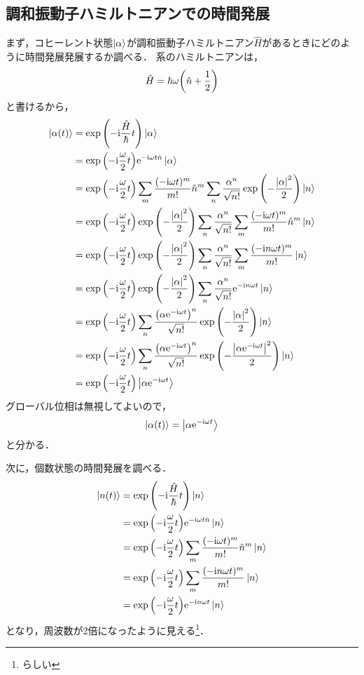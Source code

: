 \documentclass{report}
\begin{document}
  \subsection{調和振動子ハミルトニアンでの時間発展}
    まず，コヒーレント状態$\ket{\alpha}$が調和振動子ハミルトニアン$\hat{H}$があるときにどのように時間発展発展するか調べる．
    系のハミルトニアンは，
    \begin{align}
      \hat{H} = \hbar\omega\qty(\hat{n} + \frac{1}{2})
    \end{align}
    と書けるから，
    \begin{align}
      \ket{\alpha(t)} &= \exp\qty(-\mathrm{i}\frac{\hat{H}}{\hbar}t)\ket{\alpha} \\ 
      &= \exp\qty(-\mathrm{i}\frac{\omega}{2}t)\mathrm{e}^{-\mathrm{i}\omega t \hat{n}}\ket{\alpha} \\ 
      &= \exp\qty(-\mathrm{i}\frac{\omega}{2}t)\sum_{m}\frac{(-\mathrm{i}\omega t)^m}{m!}\hat{n}^m \sum_{n}\frac{\alpha^n}{\sqrt{n!}}\exp\qty(-\frac{\abs{\alpha}^2}{2})\ket{n} \\ 
      &= \exp\qty(-\mathrm{i}\frac{\omega}{2}t)\exp\qty(-\frac{\abs{\alpha}^2}{2}) \sum_{n}\frac{\alpha^n}{\sqrt{n!}}\sum_{m}\frac{(-\mathrm{i}\omega t)^m}{m!}\hat{n}^m\ket{n} \\ 
      &= \exp\qty(-\mathrm{i}\frac{\omega}{2}t)\exp\qty(-\frac{\abs{\alpha}^2}{2}) \sum_{n}\frac{\alpha^n}{\sqrt{n!}}\sum_{m}\frac{(-\mathrm{i} n\omega t)^m}{m!} \ket{n} \\ 
      &= \exp\qty(-\mathrm{i}\frac{\omega}{2}t)\exp\qty(-\frac{\abs{\alpha}^2}{2}) \sum_{n}\frac{\alpha^n}{\sqrt{n!}}\mathrm{e}^{-\mathrm{i} n\omega t}\ket{n} \\ 
      &= \exp\qty(-\mathrm{i}\frac{\omega}{2}t) \sum_{n}\frac{\qty(\alpha\mathrm{e}^{-\mathrm{i}\omega t})^n}{\sqrt{n!}}\exp\qty(-\frac{\abs{\alpha}^2}{2})\ket{n} \\ 
      &= \exp\qty(-\mathrm{i}\frac{\omega}{2}t) \sum_{n}\frac{\qty(\alpha\mathrm{e}^{-\mathrm{i}\omega t})^n}{\sqrt{n!}}\exp\qty(-\frac{\abs{\alpha\mathrm{e}^{-\mathrm{i}\omega t}}^2}{2})\ket{n} \\ 
      &= \exp\qty(-\mathrm{i}\frac{\omega}{2}t)\ket{\alpha\mathrm{e}^{-\mathrm{i}\omega t}}
    \end{align}
    グローバル位相は無視してよいので，
    \begin{align}
      \ket{\alpha(t)} = \ket{\alpha\mathrm{e}^{-\mathrm{i}\omega t}}
    \end{align}
    と分かる．
    \par
    次に，個数状態の時間発展を調べる．
    \begin{align}
      \ket{n(t)} &= \exp\qty(-\mathrm{i}\frac{\hat{H}}{\hbar}t)\ket{n} \\ 
      &= \exp\qty(-\mathrm{i}\frac{\omega}{2}t)\mathrm{e}^{-\mathrm{i}\omega t \hat{n}}\ket{n} \\ 
      &= \exp\qty(-\mathrm{i}\frac{\omega}{2}t)\sum_{m}\frac{(-\mathrm{i}\omega t)^m}{m!}\hat{n}^m \ket{n} \\ 
      &= \exp\qty(-\mathrm{i}\frac{\omega}{2}t)\sum_{m}\frac{(-\mathrm{i} n\omega t)^m}{m!} \ket{n} \\ 
      &= \exp\qty(-\mathrm{i}\frac{\omega}{2}t)\mathrm{e}^{-\mathrm{i} n\omega t} \ket{n}
    \end{align}
    となり，周波数が2倍になったように見える\footnote{らしい}．
\end{document}
